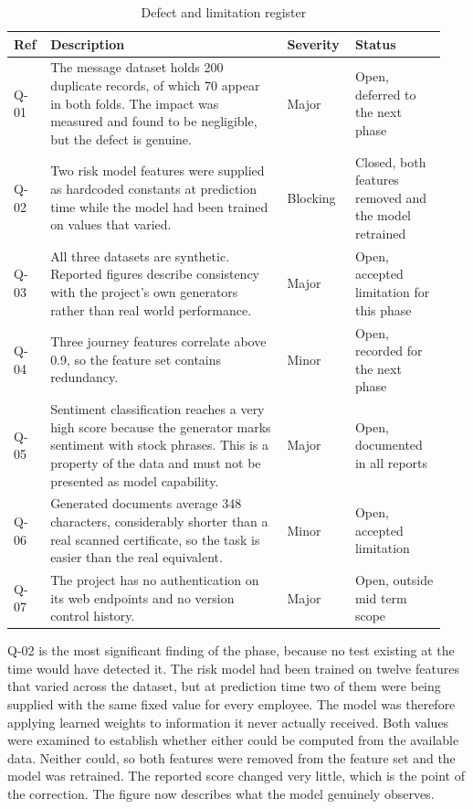 \documentclass[11pt,a4paper]{article}
\begin{document}
\begin{table}[!t]
\centering
\caption{Defect and limitation register}
\small
\setlength{\tabcolsep}{3pt}
\begin{tabular}{p{0.073\linewidth}p{0.522\linewidth}p{0.136\linewidth}p{0.209\linewidth}}
\toprule
\textbf{Ref} & \textbf{Description} & \textbf{Severity} & \textbf{Status} \\
\midrule
Q-01 & The message dataset holds 200 duplicate records, of which 70 appear in both folds. The impact was measured and found to be negligible, but the defect is genuine. & Major & Open, deferred to the next phase \\
Q-02 & Two risk model features were supplied as hardcoded constants at prediction time while the model had been trained on values that varied. & Blocking & Closed, both features removed and the model retrained \\
Q-03 & All three datasets are synthetic. Reported figures describe consistency with the project's own generators rather than real world performance. & Major & Open, accepted limitation for this phase \\
Q-04 & Three journey features correlate above 0.9, so the feature set contains redundancy. & Minor & Open, recorded for the next phase \\
Q-05 & Sentiment classification reaches a very high score because the generator marks sentiment with stock phrases. This is a property of the data and must not be presented as model capability. & Major & Open, documented in all reports \\
Q-06 & Generated documents average 348 characters, considerably shorter than a real scanned certificate, so the task is easier than the real equivalent. & Minor & Open, accepted limitation \\
Q-07 & The project has no authentication on its web endpoints and no version control history. & Major & Open, outside mid term scope \\
\bottomrule
\end{tabular}
\end{table}

Q-02 is the most significant finding of the phase, because no test existing at the time would have detected it. The risk model had been trained on twelve features that varied across the dataset, but at prediction time two of them were being supplied with the same fixed value for every employee. The model was therefore applying learned weights to information it never actually received. Both values were examined to establish whether either could be computed from the available data. Neither could, so both features were removed from the feature set and the model was retrained. The reported score changed very little, which is the point of the correction. The figure now describes what the model genuinely observes.
\end{document}
